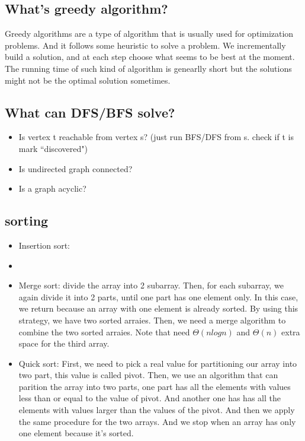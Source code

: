 \documentclass[12pt, landscape]{article}
\begin{document}
\begin{multicols}{2}
\subsection{What's greedy algorithm?}
Greedy algorithms are a type of algorithm that is usually used for optimization problems. And it follows some heuristic to solve a problem. We incrementally build a solution, and at each step choose what seems to be best at the moment. The running time of such kind of algorithm is genearlly short but the solutions might not be the optimal solution sometimes.

\subsection{What can DFS/BFS solve?}
\begin{itemize}
\item Is vertex t reachable from vertex s? (just run BFS/DFS from s. check if t is mark ``discovered")
\item Is undirected graph connected?
\item Is a graph acyclic?
\end{itemize}

\subsection{sorting}
\begin{itemize}
\item Insertion sort: 
\item
\item Merge sort: divide the array into 2 subarray. Then, for each subarray, we again divide it into 2 parts, until one part has one element only. In this case, we return because an array with one element is already sorted. By using this strategy, we have two sorted arraies. Then, we need a merge algorithm to combine the two sorted arraies.  Note that need $\Theta (nlogn)$ and $\Theta (n)$ extra space for the third array.
\item Quick sort: First, we need to pick a real value for partitioning our array into two part, this value is called pivot. Then, we use an algorithm that can parition the array into two parts, one part has all the elements with values less than or equal to the value of pivot. And another one has has all the elements with values larger than the values of the pivot. And then we apply the same procedure for the two arrays. And we stop when an array has only one element because it's sorted.


\end{itemize}
\end{multicols}
\end{document}
